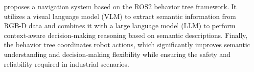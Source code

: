 \documentclass[11pt,a4paper]{article}
\begin{document}
\cite{moriconi2025foundation} proposes a navigation system based on the ROS2 behavior tree framework. It utilizes a visual language model (VLM) to extract semantic information from RGB-D data and combines it with a large language model (LLM) to perform context-aware decision-making reasoning based on semantic descriptions. Finally, the behavior tree coordinates robot actions, which significantly improves semantic understanding and decision-making flexibility while ensuring the safety and reliability required in industrial scenarios.





 

\end{document}

